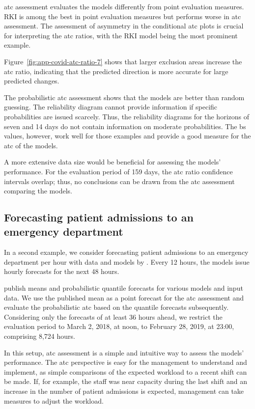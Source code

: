 \documentclass[pdflatex]{sn-jnl}
\theoremstyle{plain}%
\theoremstyle{definition}
\begin{document}
\ac{atc} assessment evaluates the models differently from point evaluation measures.
RKI is among the best in point evaluation measures but performs worse in \ac{atc} assessment.
The assessment of asymmetry in the conditional \ac{atc} plots is crucial for interpreting the \ac{atc} ratios, with the RKI model being the most prominent example.

Figure~\ref{fig:app-covid-atc-ratio-7} shows that larger exclusion areas increase the \ac{atc} ratio, indicating that the predicted direction is more accurate for large predicted changes.

The probabilistic \ac{atc} assessment shows that the models are better than random guessing.
The reliability diagram cannot provide information if specific probabilities are issued scarcely.
Thus, the reliability diagrams for the horizons of seven and 14 days do not contain information on moderate probabilities.
The \ac{bs} values, however, work well for those examples and provide a good measure for the \ac{atc} of the models.

A more extensive data size would be beneficial for assessing the models' performance.
For the evaluation period of 159 days, the \ac{atc} ratio confidence intervals overlap; thus, no conclusions can be drawn from the \ac{atc} assessment comparing the models.

\subsection{Forecasting patient admissions to an emergency department}\label{sec:application-eda}

In a second example, we consider forecasting patient admissions to an emergency department per hour with data and models by \citet{Rostami-Tabar2023}.
Every 12 hours, the models issue hourly forecasts for the next 48 hours.

\citet{Rostami-Tabar2023} publish means and probabilistic quantile forecasts for various models and input data.
We use the published mean as a point forecast for the \ac{atc} assessment and evaluate the probabilistic \ac{atc} based on the quantile forecasts subsequently.
Considering only the forecasts of at least 36 hours ahead, we restrict the evaluation period to March 2, 2018, at noon, to February 28, 2019, at 23:00, comprising 8,724 hours.

In this setup, \ac{atc} assessment is a simple and intuitive way to assess the models' performance.
The \ac{atc} perspective is easy for the management to understand and implement, as simple comparisons of the expected workload to a recent shift can be made.
If, for example, the staff was near capacity during the last shift and an increase in the number of patient admissions is expected, management can take measures to adjust the workload.
\end{document}
